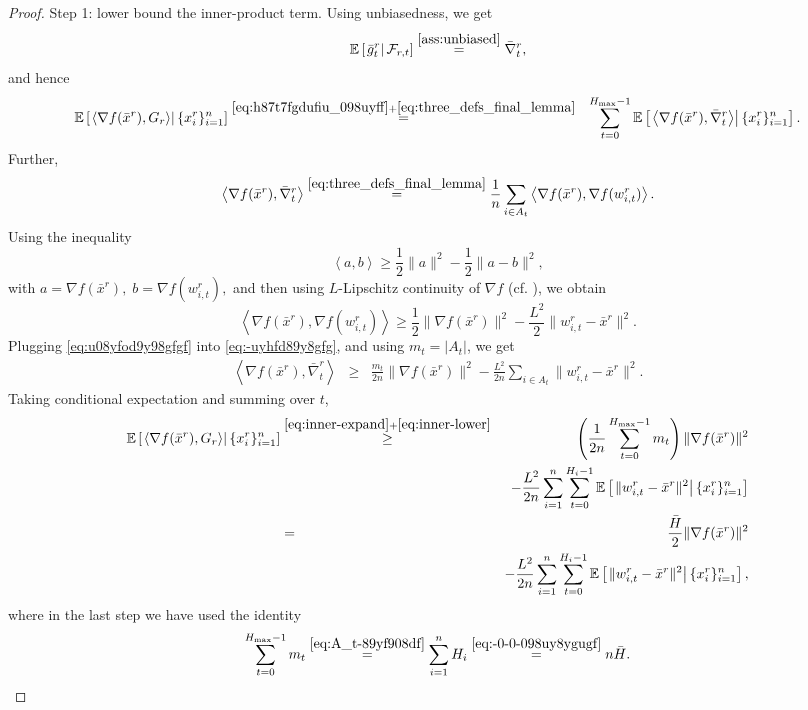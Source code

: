 \documentclass[10pt,a4paper]{amsart}
\newcommand{\ExpCond}[2]{{\mathbb{E}}\left[\left.#1\right\vert#2\right]}
\newcommand{\anglebr}[1]{\left\langle#1\right\rangle} %
\newcommand{\cF}{\mathcal{F}}
\newcommand{\inner}[2]{\anglebr{#1, #2}}
\providecommand{\paragraph}{}
\begin{document}
\begin{proof}
\paragraph{Step 1: lower bound the inner-product term.}
Using unbiasedness, we get
\begin{equation}\label{eq:h87t7fgdufiu_098uyff}
\ExpCond{ \bar g_t^r }{ \cF_{r,t} } \overset{\Cref{ass:unbiased}}{=} \bar\nabla_t^r,
\end{equation}
and hence
\begin{eqnarray}
\ExpCond{ \inner{\nabla f(\bar x^r)}{G_r} }{ \{x_i^r\}_{i=1}^n }
&\overset{\eqref{eq:h87t7fgdufiu_098uyff}+\eqref{eq:three_defs_final_lemma}}{=}&
\sum_{t=0}^{H_{\max}-1}
\ExpCond{ \inner{\nabla f(\bar x^r)}{\bar\nabla_t^r} }{ \{x_i^r\}_{i=1}^n }.
\label{eq:inner-expand}
\end{eqnarray}
Further, 
\begin{equation}\label{eq:-uyhfd89y8gfg}
\inner{\nabla f(\bar x^r)}{\bar\nabla_t^r}
\overset{\eqref{eq:three_defs_final_lemma}}{=}
\frac{1}{n}\sum_{i\in A_t}
\inner{\nabla f(\bar x^r)}{\nabla f(w_{i,t}^r)}.
\end{equation}
Using the inequality
\[
\inner{a}{b}
\ge
\frac{1}{2}\|a\|^2-\frac{1}{2}\|a-b\|^2,
\]
with
\(
a=\nabla f(\bar x^r),\;
b=\nabla f(w_{i,t}^r),
\)
and then using \(L\)-Lipschitz continuity of \(\nabla f\) (cf. ), we obtain
\begin{equation}\label{eq:u08yfod9y98gfgf}
\inner{\nabla f(\bar x^r)}{\nabla f(w_{i,t}^r)}
\ge
\frac{1}{2}\|\nabla f(\bar x^r)\|^2
-
\frac{L^2}{2}\|w_{i,t}^r-\bar x^r\|^2.
\end{equation}
Plugging \eqref{eq:u08yfod9y98gfgf} into \eqref{eq:-uyhfd89y8gfg}, and using $m_t = |A_t|$, we get
\begin{eqnarray}
\inner{\nabla f(\bar x^r)}{\bar\nabla_t^r}
&\ge&
\frac{m_t}{2n}\|\nabla f(\bar x^r)\|^2
-
\frac{L^2}{2n}\sum_{i\in A_t}\|w_{i,t}^r-\bar x^r\|^2.
\label{eq:inner-lower}
\end{eqnarray}
Taking conditional expectation and summing over \(t\),
\begin{eqnarray}
\ExpCond{ \inner{\nabla f(\bar x^r)}{G_r} }{ \{x_i^r\}_{i=1}^n }
&\overset{\eqref{eq:inner-expand}+\eqref{eq:inner-lower}}{\ge}&
\left(\frac1{2n}\sum_{t=0}^{H_{\max}-1}m_t\right)\|\nabla f(\bar x^r)\|^2
\notag\\
&&
-
\frac{L^2}{2n}
\sum_{i=1}^n\sum_{t=0}^{H_i-1}
\ExpCond{ \|w_{i,t}^r-\bar x^r\|^2 }{ \{x_i^r\}_{i=1}^n } \notag \\
&=&\frac{\bar H}{2}\|\nabla f(\bar x^r)\|^2
\notag\\
&&
-
\frac{L^2}{2n}
\sum_{i=1}^n\sum_{t=0}^{H_i-1}
\ExpCond{ \|w_{i,t}^r-\bar x^r\|^2 }{ \{x_i^r\}_{i=1}^n } ,
\label{eq:inner-before-distance}
\end{eqnarray}
where in the last step we have used the identity
\[
\sum_{t=0}^{H_{\max}-1}m_t
\overset{\eqref{eq:A_t-89yf908df}}{=}
\sum_{i=1}^n H_i
\overset{\eqref{eq:-0-0-098uy8ygugf}}{=}
n\bar H.
\]



\end{proof}
\end{document}
